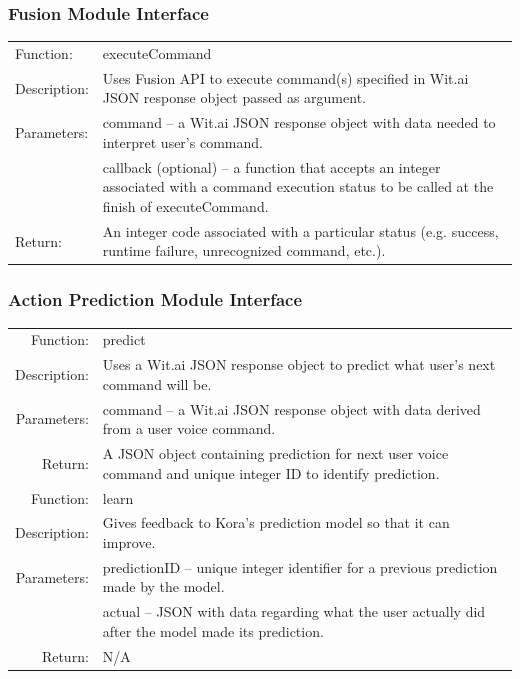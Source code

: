 \documentclass[onecolumn, draftclsnofoot,10pt, compsoc]{IEEEtran}
\def \botname{Kora\xspace}
\begin{document}
	\subsubsection{Fusion Module Interface}
	\begin{tabular}[t]{l p{6in}}
		\hline
		Function: & executeCommand \\
		Description: & Uses Fusion API to execute command(s) specified in Wit.ai JSON response object passed as argument. \\
		Parameters: & command -- a Wit.ai JSON response object with data needed to interpret user's command. \\
		& callback (optional) -- a function that accepts an integer associated with a command execution status to be called at the finish of executeCommand. \\
		Return: & An integer code associated with a particular status (e.g. success, runtime failure, unrecognized command, etc.). \\
		\hline
	\end{tabular}

	\subsubsection{Action Prediction Module Interface}
	\begin{tabular}[t]{r p{6in}}
		\hline
		Function: & predict \\
		Description: & Uses a Wit.ai JSON response object to predict what user's next command will be. \\
		Parameters: & command -- a Wit.ai JSON response object with data derived from a user voice command. \\
		Return: & A JSON object containing prediction for next user voice command and unique integer ID to identify prediction. \\
		\hline
		Function: & learn \\
		Description: & Gives feedback to \botname's prediction model so that it can improve. \\
		Parameters: & predictionID -- unique integer identifier for a previous prediction made by the model. \\
		& actual -- JSON with data regarding what the user actually did after the model made its prediction. \\
		Return: & N/A \\
		\hline
	\end{tabular}
\end{document}
